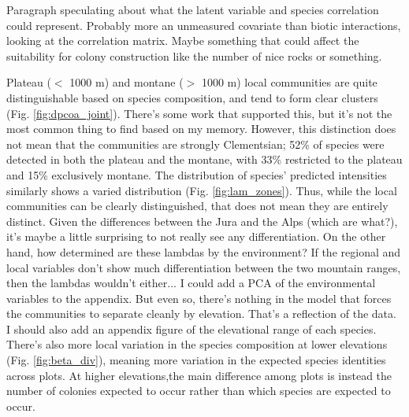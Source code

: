 \documentclass[preprint,review,times,12pt,3p]{elsarticle}
\begin{document}
Paragraph speculating about what the latent variable and species correlation could represent. Probably more an unmeasured covariate than biotic interactions, looking at the correlation matrix. Maybe something that could affect the suitability for colony construction like the number of nice rocks or something. 

Plateau ($<$ 1000 m) and montane ($>$ 1000 m) local communities are quite distinguishable based on species composition, and tend to form clear clusters (Fig. \ref{fig:dpcoa_joint}). There's some work that supported this, but it's not the most common thing to find based on my memory. However, this distinction does not mean that the communities are strongly Clementsian; 52\% of species were detected in both the plateau and the montane, with 33\% restricted to the plateau and 15\% exclusively montane. The distribution of species' predicted intensities similarly shows a varied distribution (Fig. \ref{fig:lam_zones}). Thus, while the local communities can be clearly distinguished, that does not mean they are entirely distinct. Given the differences between the Jura and the Alps (which are what?), it's maybe a little surprising to not really see any differentiation. On the other hand, how determined are these lambdas by the environment? If the regional and local variables don't show much differentiation between the two mountain ranges, then the lambdas wouldn't either... I could add a PCA of the environmental variables to the appendix. But even so, there's nothing in the model that forces the communities to separate cleanly by elevation. That's a reflection of the data. I should also add an appendix figure of the elevational range of each species. There's also more local variation in the species composition at lower elevations (Fig. \ref{fig:beta_div}), meaning more variation in the expected species identities across plots. At higher elevations,the main difference among plots is instead the number of colonies expected to occur rather than which species are expected to occur.
\end{document}

